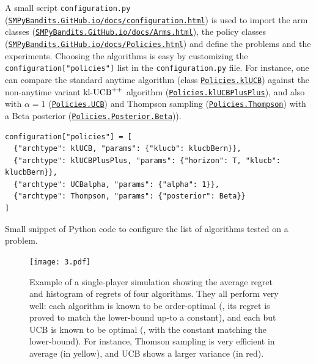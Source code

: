A small script \texttt{configuration.py} (\texttt{\href{https://SMPyBandits.GitHub.io/docs/configuration.html}{SMPyBandits.GitHub.io/docs/configuration.html}}) is used to import the arm classes (\texttt{\href{https://SMPyBandits.GitHub.io/docs/Arms.html}{SMPyBandits.GitHub.io/docs/Arms.html}}), the policy classes (\texttt{\href{https://SMPyBandits.GitHub.io/docs/Policies.html}{SMPyBandits.GitHub.io/docs/Policies.html}}) and define the problems and the experiments.
Choosing the algorithms is easy by customizing the \texttt{configuration["policies"]} list in the \texttt{configuration.py} file.
For instance, one can compare the standard anytime \klUCB{} algorithm (class \texttt{\href{https://SMPyBandits.GitHub.io/docs/Policies.klUCB.html}{Policies.klUCB}}) against the non-anytime variant $\mathrm{kl}\text{-}\mathrm{UCB}^{++}$ algorithm (\texttt{\href{https://SMPyBandits.GitHub.io/docs/Policies.klUCBPlusPlus.html}{Policies.klUCBPlusPlus}}), and also \UCB{} with $\alpha=1$ (\texttt{\href{https://SMPyBandits.GitHub.io/docs/Policies.UCBalpha.html}{Policies.UCB}}) and Thompson sampling (\texttt{\href{https://SMPyBandits.GitHub.io/docs/Policies.Thompson.html}{Policies.Thompson}}) with a Beta posterior (\texttt{\href{https://SMPyBandits.GitHub.io/docs/Policies.Posterior.Beta.html}{Policies.Posterior.Beta}})).

\begin{small}
\begin{listing}[h!]
    \begin{verbatim}
configuration["policies"] = [
  {"archtype": klUCB, "params": {"klucb": klucbBern}},
  {"archtype": klUCBPlusPlus, "params": {"horizon": T, "klucb": klucbBern}},
  {"archtype": UCBalpha, "params": {"alpha": 1}},
  {"archtype": Thompson, "params": {"posterior": Beta}}
]
    \end{verbatim}
    \caption{Small snippet of Python code to configure the list of algorithms tested on a problem.}
    \label{lst:3:howToConfigureAlgorithms}
\end{listing}
\end{small}

\begin{figure}[h!]  %
	\texttt{[image: 3.pdf]}
	\caption[Example of a single-player simulation showing the average regret and histogram of regrets of $4$ algorithms]{
		Example of a single-player simulation showing the average regret and histogram of regrets of four algorithms. They all perform very well: each algorithm is known to be order-optimal (\ie, its regret is proved to match the lower-bound up-to a constant), and each but UCB is known to be optimal (\ie, with the constant matching the lower-bound). For instance, Thomson sampling is very efficient in average (in yellow), and UCB shows a larger variance (in red).
	}
	\label{fig:3:firstPlot}
\end{figure}

